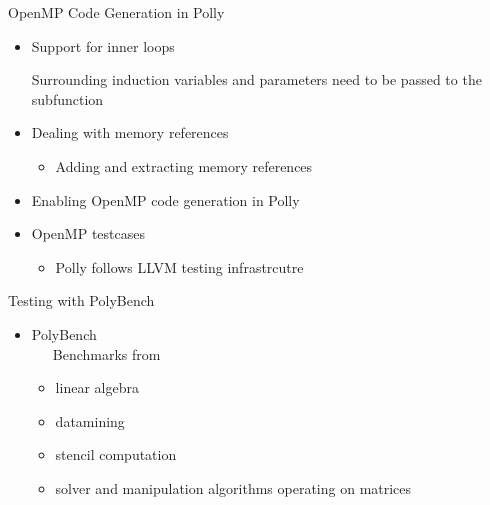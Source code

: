 \documentclass{beamer}
\begin{document}
\begin{frame}[allowframebreaks]{OpenMP Code Generation in Polly}
\begin{itemize}
\item Support for inner loops

\begin{block}{ }
{\tiny}
\end{block}
Surrounding induction variables and parameters need to be passed to the subfunction

\item Dealing with memory references
\begin{block}{ }
{\tiny}
\end{block}
	\begin{itemize}
	\item Adding and extracting memory references
	\end{itemize}
\item Enabling OpenMP code generation in Polly
\begin{block}{ }
{\tiny}
\end{block}
\item OpenMP testcases
	\begin{itemize}
	\item Polly follows LLVM testing infrastrcutre
	\end{itemize}
\end{itemize}
\end{frame}

\begin{frame}[allowframebreaks]{Testing with PolyBench}
\begin{itemize}
\item PolyBench \\
	\ \ \ Benchmarks from
	\begin{itemize}
	\item linear algebra
	\item datamining
	\item stencil computation
	\item solver and manipulation algorithms operating on matrices
	\end{itemize}
\end{itemize}
\end{frame}
\end{document}
